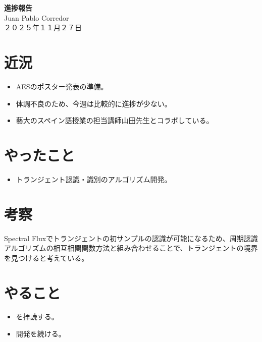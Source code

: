 \documentclass[a4paper, 11pt]{article}
\begin{document}
\begin{center}
    {\LARGE \bfseries 進捗報告} \\ %
    \vspace{0.3em} %
    Juan Pablo Corredor \\ %
    ２０２５年１１月２７日 %
\end{center}
\vspace{0.5em} %

\section*{近況}
\begin{itemize}
    \item AESのポスター発表の準備。
    \item 体調不良のため、今週は比較的に進捗が少ない。
    \item 藝大のスペイン語授業の担当講師山田先生とコラボしている。
\end{itemize} 

\section*{やったこと}
\begin{itemize} 
    \item トランジェント認識・識別のアルゴリズム開発。
\end{itemize}

\section*{考察}

Spectral Fluxでトランジェントの初サンプルの認識が可能になるため、周期認識アルゴリズムの相互相関関数方法と組み合わせることで、トランジェントの境界を見つけると考えている。

\section*{やること}
\begin{itemize}
    \item \cite{EstimationOfGuitarString}を拝読する。
    \item 開発を続ける。
\end{itemize}


\printbibliography
\end{document}
